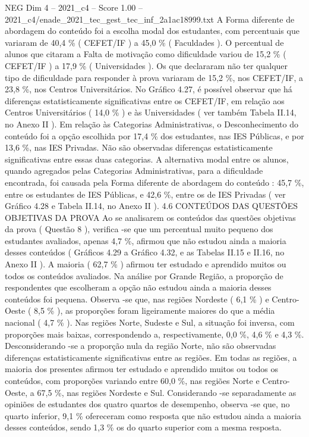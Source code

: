 \begin{textsample}{NEG Dim 4 – 2021\_c4 – Score 1.00 – 2021\_c4/enade\_2021\_tec\_gest\_tec\_inf\_2a1ac18999.txt}
A Forma diferente de abordagem do conteúdo foi a escolha modal dos estudantes, com percentuais que variaram de 40,4 \% ( CEFET/IF ) a 45,0 \% ( Faculdades ).
O percentual de alunos que citaram a Falta de motivação como dificuldade variou de 15,2 \% ( CEFET/IF ) a 17,9 \% ( Universidades ).
Os que declararam não ter qualquer tipo de dificuldade para responder à prova variaram de 15,2 \%, nos CEFET/IF, a 23,8 \%, nos Centros Universitários.
No Gráfico 4.27, é possível observar que há diferenças estatisticamente significativas entre os CEFET/IF, em relação aos Centros Universitários ( 14,0 \% ) e às Universidades ( ver também Tabela II.14, no Anexo II ).
Em relação às Categorias Administrativas, o Desconhecimento do conteúdo foi a opção escolhida por 17,4 \% dos estudantes, nas IES Públicas, e por 13,6 \%, nas IES Privadas.
Não são observadas diferenças estatisticamente significativas entre essas duas categorias.
A alternativa modal entre os alunos, quando agregados pelas Categorias Administrativas, para a dificuldade encontrada, foi causada pela Forma diferente de abordagem do conteúdo : 45,7 \%, entre os estudantes de IES Públicas, e 42,6 \%, entre os de IES Privadas ( ver Gráfico 4.28 e Tabela II.14, no Anexo II ). 4.6 CONTEÚDOS DAS QUESTÕES OBJETIVAS DA PROVA Ao se analisarem os conteúdos das questões objetivas da prova ( Questão 8 ), verifica -se que um percentual muito pequeno dos estudantes avaliados, apenas 4,7 \%, afirmou que não estudou ainda a maioria desses conteúdos ( Gráficos 4.29 a Gráfico 4.32, e as Tabelas II.15 e II.16, no Anexo II ).
A maioria ( 62,7 \% ) afirmou ter estudado e aprendido muitos ou todos os conteúdos avaliados.
Na análise por Grande Região, a proporção de respondentes que escolheram a opção não estudou ainda a maioria desses conteúdos foi pequena.
Observa -se que, nas regiões Nordeste ( 6,1 \% ) e Centro-Oeste ( 8,5 \% ), as proporções foram ligeiramente maiores do que a média nacional ( 4,7 \% ).
Nas regiões Norte, Sudeste e Sul, a situação foi inversa, com proporções mais baixas, correspondendo a, respectivamente, 0,0 \%, 4,6 \% e 4,3 \%.
Desconsiderando -se a proporção nula da região Norte, não são observadas diferenças estatisticamente significativas entre as regiões.
Em todas as regiões, a maioria dos presentes afirmou ter estudado e aprendido muitos ou todos os conteúdos, com proporções variando entre 60,0 \%, nas regiões Norte e Centro-Oeste, a 67,5 \%, nas regiões Nordeste e Sul.
Considerando -se separadamente as opiniões de estudantes dos quatro quartos de desempenho, observa -se que, no quarto inferior, 9,1 \% ofereceram como resposta que não estudou ainda a maioria desses conteúdos, sendo 1,3 \% os do quarto superior com a mesma resposta.

\end{textsample}
